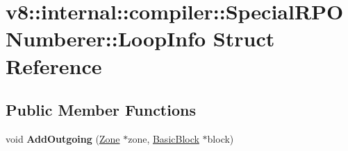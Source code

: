 \hypertarget{structv8_1_1internal_1_1compiler_1_1_special_r_p_o_numberer_1_1_loop_info}{}\section{v8\+:\+:internal\+:\+:compiler\+:\+:Special\+R\+P\+O\+Numberer\+:\+:Loop\+Info Struct Reference}
\label{structv8_1_1internal_1_1compiler_1_1_special_r_p_o_numberer_1_1_loop_info}
\subsection*{Public Member Functions}
\begin{DoxyCompactItemize}
\item 
void {\bfseries Add\+Outgoing} (\hyperlink{classv8_1_1internal_1_1_zone}{Zone} $\ast$zone, \hyperlink{classv8_1_1internal_1_1compiler_1_1_basic_block}{Basic\+Block} $\ast$block)\hypertarget{structv8_1_1internal_1_1compiler_1_1_special_r_p_o_numberer_1_1_loop_info_aa8231162d3b036d644ba752d401bce87}{}\label{structv8_1_1internal_1_1compiler_1_1_special_r_p_o_numberer_1_1_loop_info_aa8231162d3b036d644ba752d401bce87}

\end{DoxyCompactItemize}
